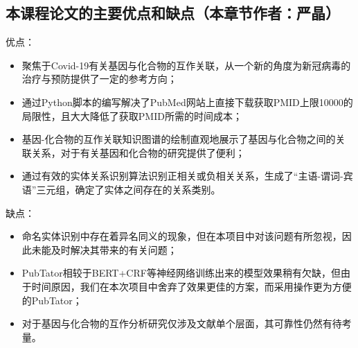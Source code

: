 \documentclass[twocolumn]{article}
\begin{document}
\subsection{本课程论文的主要优点和缺点（本章节作者：严晶）}
优点：\par
\begin{itemize}
	\item 聚焦于Covid-19有关基因与化合物的互作关联，从一个新的角度为新冠病毒的治疗与预防提供了一定的参考方向；
	\item 通过Python脚本的编写解决了PubMed网站上直接下载获取PMID上限10000的局限性，且大大降低了获取PMID所需的时间成本；
	\item 基因-化合物的互作关联知识图谱的绘制直观地展示了基因与化合物之间的关联关系，对于有关基因和化合物的研究提供了便利；
	\item 通过有效的实体关系识别算法识别正相关或负相关关系，生成了“主语-谓词-宾语”三元组，确定了实体之间存在的关系类别。
\end{itemize}\par
缺点：\par
\begin{itemize}
	\item 命名实体识别中存在着异名同义的现象，但在本项目中对该问题有所忽视，因此未能及时解决其带来的有关问题；
	\item PubTator相较于BERT+CRF等神经网络训练出来的模型效果稍有欠缺，但由于时间原因，我们在本次项目中舍弃了效果更佳的方案，而采用操作更为方便的PubTator；
	\item 对于基因与化合物的互作分析研究仅涉及文献单个层面，其可靠性仍然有待考量。
\end{itemize}\par
\end{document}
